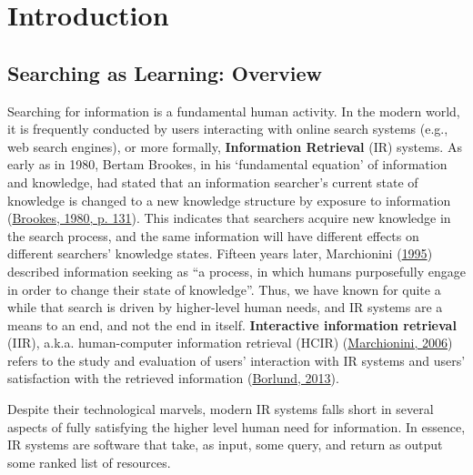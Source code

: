 \documentclass[letterpaper, nobind]{templates/ociamthesis}
\begin{document}
\flushbottom

\hypertarget{introduction}{%
\chapter{Introduction}\label{introduction}}

\hypertarget{sec-intro-overview}{%
\section{Searching as Learning: Overview}\label{sec-intro-overview}}

Searching for information is a fundamental human activity. In the modern world, it is frequently conducted by users interacting with online search systems (e.g., web search engines), or more formally, \textbf{Information Retrieval} (IR) systems.
As early as in 1980, Bertam Brookes, in his `fundamental equation' of information and knowledge, had stated that an information searcher's current state of knowledge is changed to a new knowledge structure by exposure to information (\protect\hyperlink{ref-brookes1980foundations}{Brookes, 1980, p. 131}).
This indicates that searchers acquire new knowledge in the search process, and the same information will have different effects on different searchers' knowledge states.
Fifteen years later, Marchionini (\protect\hyperlink{ref-marchionini1995information}{1995}) described information seeking as ``a process, in which humans purposefully engage in order to change
their state of knowledge''.
Thus, we have known for quite a while that search is driven by higher-level human needs, and IR systems are a means to an end, and not the end in itself.
\textbf{Interactive information retrieval} (IIR), a.k.a. human-computer information retrieval (HCIR) (\protect\hyperlink{ref-marchionini2006toward}{Marchionini, 2006}) refers to the study and evaluation of users' interaction with IR systems and users' satisfaction with the retrieved information (\protect\hyperlink{ref-borlund2013interactive}{Borlund, 2013}).

Despite their technological marvels, modern IR systems falls short in several aspects of fully satisfying the higher level human need for information.
In essence, IR systems are software that take, as input, some query, and return as output some ranked list of resources.
\end{document}
